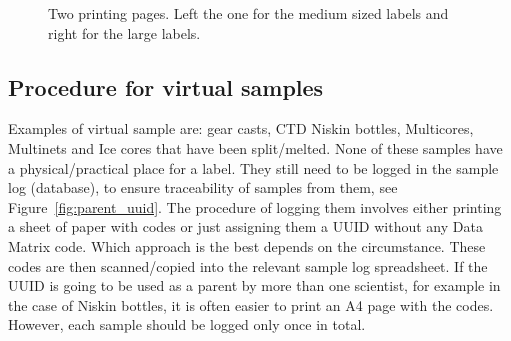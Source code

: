 \documentclass[a4paper,english, 11pt]{article}
\begin{document}
\begin{figure}[htb]
    \caption{\label{fig:printing}
        Two printing pages. Left the one for the medium sized labels and right for the large labels.
    }
\end{figure}


\subsection{Procedure for virtual samples} %
\label{sub:Procedure_for_virtual_samples}



Examples of virtual sample are: gear casts, CTD Niskin bottles, Multicores, Multinets and Ice cores that have been split/melted. None of these samples have a physical/practical place for a label. They still need to be logged in the sample log (database), to ensure traceability of samples from them, see Figure~\ref{fig:parent_uuid}. The procedure of logging them involves either printing a sheet of paper with codes or just assigning them a UUID without any Data Matrix code. Which approach is the best depends on the circumstance. These codes are then scanned/copied into the relevant sample log spreadsheet. If the UUID is going to be used as a parent by more than one scientist, for example in the case of Niskin bottles, it is often easier to print an A4 page with the codes. However, each sample should be logged only once in total. 
\end{document}
